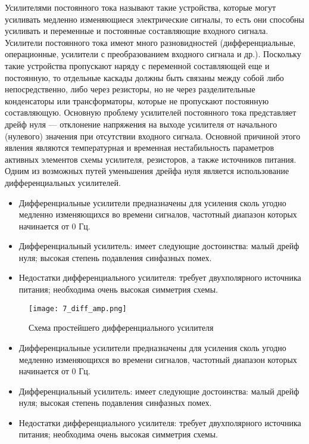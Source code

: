 Усилителями постоянного тока называют такие устройства, которые могут усиливать медленно изменяющиеся электрические сигналы, то есть они способны усиливать и переменные и постоянные составляющие входного сигнала. Усилители постоянного тока имеют много разновидностей (дифференциальные, операционные, усилители с преобразованием входного сигнала и др.). Поскольку такие устройства пропускают наряду с переменной составляющей еще и постоянную, то отдельные каскады должны быть связаны между собой либо непосредственно, либо через резисторы, но не через разделительные конденсаторы или трансформаторы, которые не пропускают постоянную составляющую. Основную проблему усилителей постоянного тока представляет дрейф нуля --- отклонение напряжения на выходе усилителя от начального (нулевого) значения при отсутствии входного сигнала. Основной причиной этого явления являются температурная и временная нестабильность параметров активных элементов схемы усилителя, резисторов, а также источников питания. Одним из возможных путей 
уменьшения дрейфа нуля является использование дифференциальных усилителей.

\begin{itemize}
\item Дифференциальные усилители предназначены для усиления сколь угодно медленно изменяющихся во времени сигналов, частотный диапазон которых начинается от 0 Гц.
\item Дифференциальный усилитель: имеет следующие достоинства: малый дрейф нуля; высокая степень подавления синфазных помех.
\item Недостатки дифференциального усилителя: требует двухполярного источника питания; необходима очень высокая симметрия схемы.
\end{itemize}

\begin{figure}[H]
\centering
\texttt{[image: 7\_diff\_amp.png]}
\caption{Схема простейшего дифференциального усилителя}
\label{fig:7_diff_amp}
\end{figure}

\begin{itemize}
\item Дифференциальные усилители предназначены для усиления сколь угодно медленно изменяющихся во времени сигналов, частотный диапазон которых начинается от 0 Гц.
\item Дифференциальный усилитель: имеет следующие достоинства: малый дрейф нуля; высокая степень подавления синфазных помех.
\item Недостатки дифференциального усилителя: требует двухполярного источника питания; необходима очень высокая симметрия схемы.
\end{itemize}


